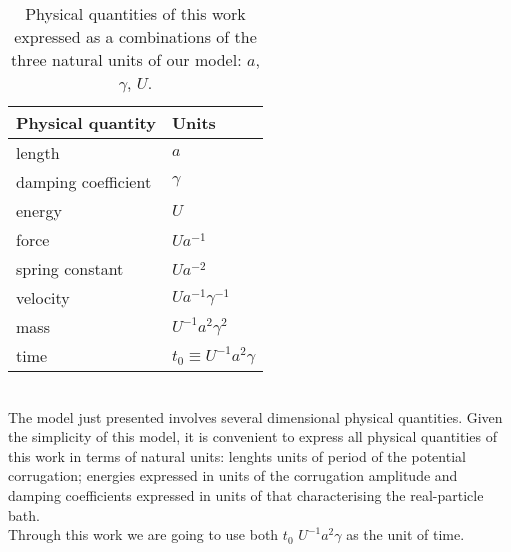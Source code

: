 \begin{table}[ht]
\centering 
\begin{tabular}{ll}
    \toprule
    Physical quantity & Units \\
    \midrule
    length    &  $a$   \\
    damping coefficient    &  $\gamma$   \\
    energy & $U$ \\
    force & $U a^{-1}$ \\
    spring constant & $U a^{-2}$\\
    velocity & $U a^{-1}\gamma ^{-1} $\\
    mass & $ U^{-1} a^2 \gamma^2$ \\
    time & $t_0 \equiv U^{-1}a^2\gamma $\\
    \bottomrule
\end{tabular}
\caption{Physical quantities of this work expressed as a combinations of the three natural units of our model: $a$, $\gamma$, $U$.}
\label{tab:physical_quantities}
\end{table}
\\
The model just presented involves several dimensional physical quantities. Given the simplicity of this model, it is convenient to express all physical quantities of this work in terms of natural units: lenghts units of period of the potential corrugation; energies expressed in units of the corrugation amplitude and damping coefficients expressed in units of that characterising the real-particle bath.
\\
Through this work we are going to use both $t_0$ $U^{-1}a^2\gamma$ as the unit of time.
